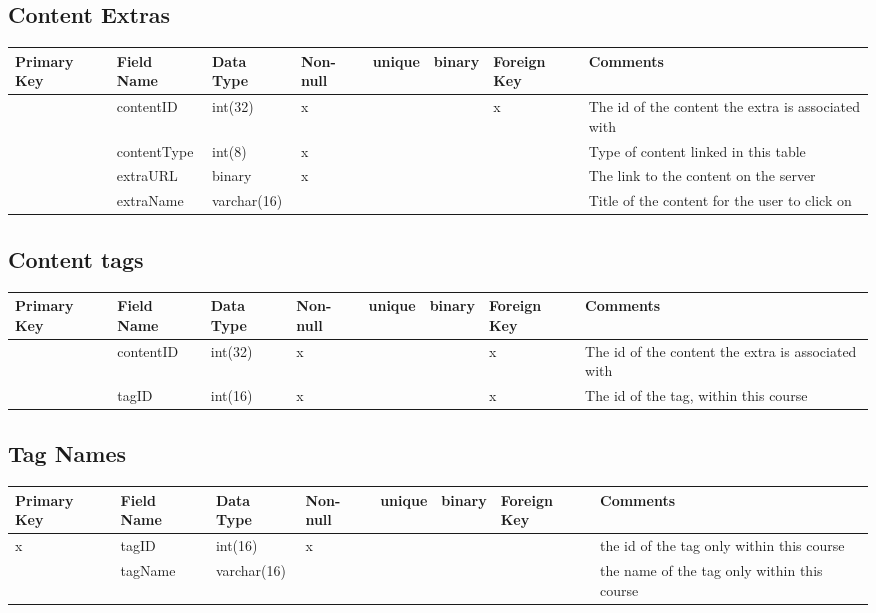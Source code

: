 \documentclass{article}
\begin{document}
\subsection{Content Extras}
\begin{tabular}{|m{1cm} | m{2cm} | m{1.5cm}| m{1cm} | m{1cm}| m{1cm} | m{1cm}| m{4cm}| }
  \hline
  Primary Key & Field Name & Data Type & Non-null & unique & binary & Foreign Key & Comments\\ 
  \hline
   & contentID & int(32) & x & & & x & The id of the content the extra is associated with\\
  \hline
   & contentType & int(8) & x & & & & Type of content linked in this table\\
  \hline
   & extraURL & binary & x & & & & The link to the content on the server\\
  \hline
   & extraName & varchar(16) & & & & & Title of the content for the user to click on\\
  \hline
\end{tabular}

\subsection{Content tags}
\begin{tabular}{|m{1cm} | m{2cm} | m{1.5cm}| m{1cm} | m{1cm}| m{1cm} | m{1cm}| m{4cm}| }
  \hline
  Primary Key & Field Name & Data Type & Non-null & unique & binary & Foreign Key & Comments\\ 
  \hline
   & contentID & int(32) & x & & & x & The id of the content the extra is associated with\\
  \hline
   & tagID & int(16) & x & & & x & The id of the tag, within this course\\
  \hline
\end{tabular}

\subsection{Tag Names}
\begin{tabular}{|m{1cm} | m{2cm} | m{1.5cm}| m{1cm} | m{1cm}| m{1cm} | m{1cm}| m{4cm}| }
  \hline
  Primary Key & Field Name & Data Type & Non-null & unique & binary & Foreign Key & Comments\\ 
  \hline
  x & tagID & int(16) & x & & & & the id of the tag only within this course\\
  \hline
   & tagName & varchar(16) & & & & & the name of the tag only within this course\\
  \hline
\end{tabular}
\end{document}
